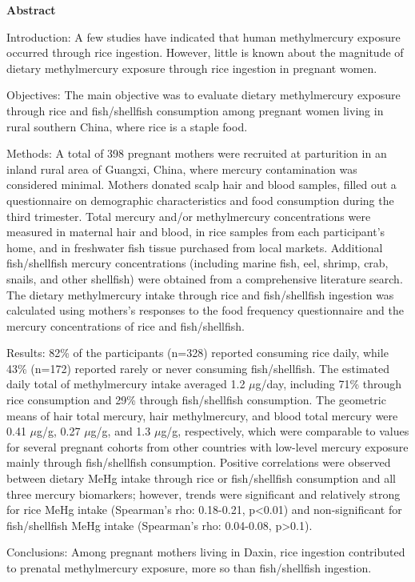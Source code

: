 \textbf{Abstract}

Introduction: A few studies have indicated that human methylmercury exposure occurred through rice ingestion. However, little is known about the magnitude of dietary methylmercury exposure through rice ingestion in pregnant women.

Objectives: The main objective was to evaluate dietary methylmercury exposure through rice and fish/shellfish consumption among pregnant women living in rural southern China, where rice is a staple food. 

Methods: A total of 398 pregnant mothers were recruited at parturition in an inland rural area of Guangxi, China, where mercury contamination was considered minimal. Mothers donated scalp hair and blood samples, filled out a questionnaire on demographic characteristics and food consumption during the third trimester. Total mercury and/or methylmercury concentrations were measured in maternal hair and blood, in rice samples from each participant's home, and in freshwater fish tissue purchased from local markets. Additional fish/shellfish mercury concentrations (including marine fish, eel, shrimp, crab, snails, and other shellfish) were obtained from a comprehensive literature search. The dietary methylmercury intake through rice and fish/shellfish ingestion was calculated using mothers's responses to the food frequency questionnaire and the mercury concentrations of rice and fish/shellfish. 

Results: 82\% of the participants (n=328) reported consuming rice daily, while 43\% (n=172) reported rarely or never consuming fish/shellfish. The estimated daily total of methylmercury intake averaged 1.2 \({\mu}\)g/day, including 71\% through rice consumption and 29\% through fish/shellfish consumption. The geometric means of hair total mercury, hair methylmercury, and blood total mercury were 0.41 \({\mu}\)g/g, 0.27 \({\mu}\)g/g, and 1.3 \({\mu}\)g/g, respectively, which were comparable to values for several pregnant cohorts from other countries with low-level mercury exposure mainly through fish/shellfish consumption. Positive correlations were observed between dietary MeHg intake through rice or fish/shellfish consumption and all three mercury biomarkers; however, trends were significant and relatively strong for rice MeHg intake (Spearman's rho: 0.18-0.21, p<0.01) and non-significant for fish/shellfish MeHg intake (Spearman's rho: 0.04-0.08, p>0.1). 

Conclusions: Among pregnant mothers living in Daxin, rice ingestion contributed to prenatal methylmercury exposure, more so than fish/shellfish ingestion.

\newpage